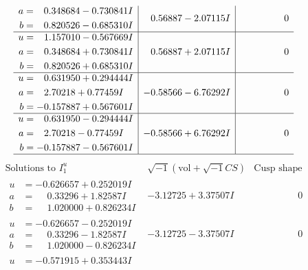 \documentclass[1p]{elsarticle_modified}
\theoremstyle{definition}
\newcommand{\I}{\sqrt{-1}}
\begin{document}
$$\begin{array}{c|c|c}
\begin{aligned}
a &= \phantom{-}0.348684 - 0.730841 I \\
b &= \phantom{-}0.820526 - 0.685310 I\end{aligned}
 & \phantom{-}0.56887 - 2.07115 I & \phantom{-0.000000 } 0 \\ \hline\begin{aligned}
u &= \phantom{-}1.157010 - 0.567669 I \\
a &= \phantom{-}0.348684 + 0.730841 I \\
b &= \phantom{-}0.820526 + 0.685310 I\end{aligned}
 & \phantom{-}0.56887 + 2.07115 I & \phantom{-0.000000 } 0 \\ \hline\begin{aligned}
u &= \phantom{-}0.631950 + 0.294444 I \\
a &= \phantom{-}2.70218 + 0.77459 I \\
b &= -0.157887 + 0.567601 I\end{aligned}
 & -0.58566 - 6.76292 I & \phantom{-0.000000 } 0 \\ \hline\begin{aligned}
u &= \phantom{-}0.631950 - 0.294444 I \\
a &= \phantom{-}2.70218 - 0.77459 I \\
b &= -0.157887 - 0.567601 I\end{aligned}
 & -0.58566 + 6.76292 I & \phantom{-0.000000 } 0\\
 \hline 
 \end{array}$$\newpage$$\begin{array}{c|c|c}  
\text{Solutions to }I^u_{1}& \I (\text{vol} + \sqrt{-1}CS) & \text{Cusp shape}\\
 \hline 
\begin{aligned}
u &= -0.626657 + 0.252019 I \\
a &= \phantom{-}0.33296 + 1.82587 I \\
b &= \phantom{-}1.020000 + 0.826234 I\end{aligned}
 & -3.12725 + 3.37507 I & \phantom{-0.000000 } 0 \\ \hline\begin{aligned}
u &= -0.626657 - 0.252019 I \\
a &= \phantom{-}0.33296 - 1.82587 I \\
b &= \phantom{-}1.020000 - 0.826234 I\end{aligned}
 & -3.12725 - 3.37507 I & \phantom{-0.000000 } 0 \\ \hline\begin{aligned}
u &= -0.571915 + 0.353443 I \\

\end{aligned}
\end{array}$$
\end{document}
